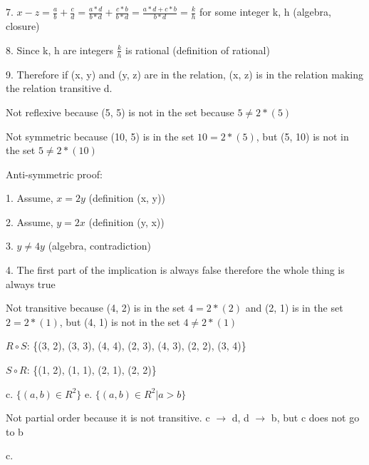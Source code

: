 \documentclass[12pt]{article}
\newenvironment{problem}[2][Problem]{\begin{trivlist}
\item[\hskip \labelsep {\bfseries #1}\hskip \labelsep {\bfseries #2.}]}{\end{trivlist}}
\begin{document}
7. $x - z = \frac{a}{b} + \frac{c}{d} = \frac{a*d}{b*d} + \frac{c*b}{b*d} = \frac{a*d+c*b}{b*d} = \frac{k}{h}$ for some integer k, h (algebra, closure)

8. Since k, h are integers $\frac{k}{h}$ is rational (definition of rational)

9. Therefore if (x, y) and (y, z) are in the relation, (x, z) is in the relation making the relation transitive
\newline
d.

Not reflexive because (5, 5) is not in the set because $5 \neq 2*(5)$

Not symmetric because (10, 5) is in the set $10 = 2*(5)$, but (5, 10) is not in the set $5 \neq 2*(10)$

Anti-symmetric proof:

1. Assume, $x = 2y$ (definition (x, y))

2. Assume, $y = 2x$ (definition (y, x))

3. $y \neq 4y$ (algebra, contradiction)

4. The first part of the implication is always false therefore the whole thing is always true

Not transitive because (4, 2) is in the set $4 = 2*(2)$ and (2, 1) is in the set $2 = 2*(1)$, but (4, 1) is not in the set $4 \neq 2*(1)$

\begin{problem}{9.1.32}
\end{problem}

$R \circ S$: \{(3, 2), (3, 3), (4, 4), (2, 3), (4, 3), (2, 2), (3, 4)\}

$S \circ R$: \{(1, 2), (1, 1), (2, 1), (2, 2)\}

\begin{problem}{9.1.36}
\end{problem}
c. $\{ (a, b) \in R^2\}$
\newline
e. $\{ (a, b) \in R^2 | a > b\}$

\begin{problem}{9.6.10}
\end{problem}

Not partial order because it is not transitive. c $\rightarrow$ d, d $\rightarrow$ b, but c does not go to b

\begin{problem}{9.6.22}
\end{problem}

c.

\end{document}
